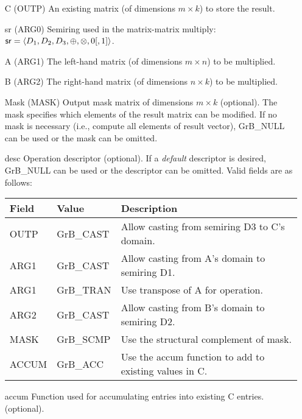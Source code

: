 \begin{itemize}[leftmargin=1.1in]
    \item[{\sf C}]    ({\sf OUTP}) An existing matrix (of dimensions $m \times k$) to store the result. 
    \item[{\sf sr}]   ({\sf ARG0}) Semiring used in the matrix-matrix multiply: ${\sf sr}=\langle D_1,D_2,D_3,\oplus,\otimes,0 [,1] \rangle$.
    \item[{\sf A}]    ({\sf ARG1}) The left-hand matrix (of dimensions $m \times n$)  to be multiplied.  
    \item[{\sf B}]    ({\sf ARG2}) The right-hand matrix (of dimensions $n \times k$) to be multiplied. 

    \item[{\sf Mask}] ({\sf MASK}) Output mask matrix of dimensions $m \times k$ (optional). 
     The mask specifies which elements of the result matrix can be modified. 
    If no mask is necessary (i.e., compute all elements of result
    vector), {\sf GrB\_NULL} can be used or the mask can be omitted.

    \item[{\sf desc}]  Operation descriptor (optional). If a
    \emph{default} descriptor is desired, {\sf GrB\_NULL} can be
    used or the descriptor can be omitted. Valid fields are as follows: \\
    \begin{tabular}{lll}
    Field  & Value & Description \\
    \hline
    {\sf OUTP} & {\sf GrB\_CAST} & Allow casting from semiring D3 to {\sf C}'s domain. \\
    {\sf ARG1} & {\sf GrB\_CAST} & Allow casting from {\sf A}'s domain to semiring D1. \\
    {\sf ARG1} & {\sf GrB\_TRAN} & Use transpose of {\sf A} for operation. \\
    {\sf ARG2} & {\sf GrB\_CAST} & Allow casting from {\sf B}'s domain to semiring D2. \\
    {\sf MASK} & {\sf GrB\_SCMP} & Use the structural complement of {\sf mask}. \\
    {\sf ACCUM}& {\sf GrB\_ACC}  & Use the {\sf accum} function to add to existing values in {\sf C}.\\
    \end{tabular}

  	\item[{\sf accum}]  Function used for accumulating entries into existing {\sf C} entries. (optional). 
\end{itemize}

